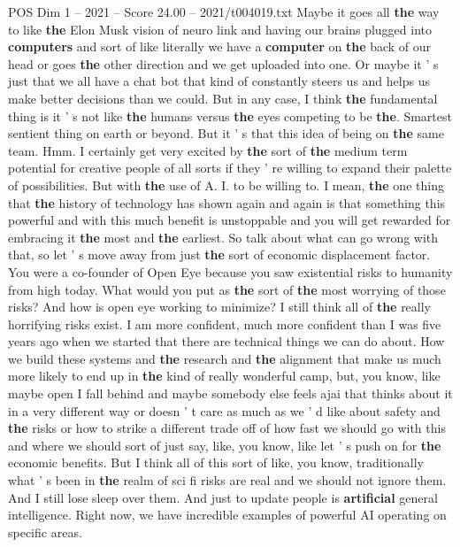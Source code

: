 \begin{textsample}{POS Dim 1 – 2021 – Score 24.00 – 2021/t004019.txt}
Maybe it goes all \textbf{the} way to like \textbf{the} Elon Musk vision of neuro link and having our brains plugged into \textbf{computers} and sort of like literally we have a \textbf{computer} on \textbf{the} back of our head or goes \textbf{the} other direction and we get uploaded into one.
Or maybe it ' s just that we all have a chat bot that kind of constantly steers us and helps us make better decisions than we could.
But in any case, I think \textbf{the} fundamental thing is it ' s not like \textbf{the} humans versus \textbf{the} eyes competing to be \textbf{the}.
Smartest sentient thing on earth or beyond.
But it ' s that this idea of being on \textbf{the} same team.
Hmm.
I certainly get very excited by \textbf{the} sort of \textbf{the} medium term potential for creative people of all sorts if they ' re willing to expand their palette of possibilities.
But with \textbf{the} use of A.
I. to be willing to.
I mean, \textbf{the} one thing that \textbf{the} history of technology has shown again and again is that something this powerful and with this much benefit is unstoppable and you will get rewarded for embracing it \textbf{the} most and \textbf{the} earliest.
So talk about what can go wrong with that, so let ' s move away from just \textbf{the} sort of economic displacement factor.
You were a co-founder of Open Eye because you saw existential risks to humanity from high today.
What would you put as \textbf{the} sort of \textbf{the} most worrying of those risks?
And how is open eye working to minimize?
I still think all of \textbf{the} really horrifying risks exist.
I am more confident, much more confident than I was five years ago when we started that there are technical things we can do about.
How we build these systems and \textbf{the} research and \textbf{the} alignment that make us much more likely to end up in \textbf{the} kind of really wonderful camp, but, you know, like maybe open I fall behind and maybe somebody else feels ajai that thinks about it in a very different way or doesn ' t care as much as we ' d like about safety and \textbf{the} risks or how to strike a different trade off of how fast we should go with this and where we should sort of just say, like, you know, like let ' s push on for \textbf{the} economic benefits.
But I think all of this sort of like, you know, traditionally what ' s been in \textbf{the} realm of sci fi risks are real and we should not ignore them.
And I still lose sleep over them.
And just to update people is \textbf{artificial} general intelligence.
Right now, we have incredible examples of powerful AI operating on specific areas.

\end{textsample}
